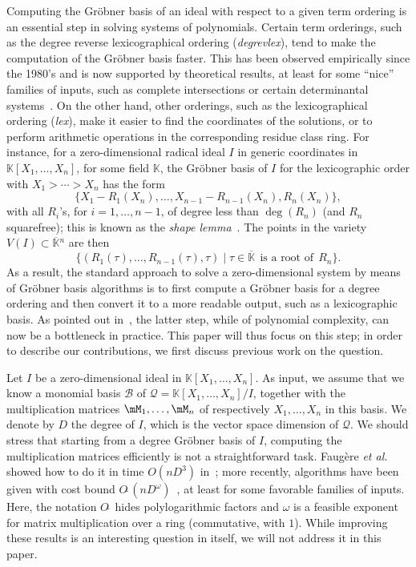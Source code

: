 \documentclass[12pt]{article}
\newcommand{\basis}{\mathscr{B}}
\newcommand{\softO}[1]{O{\tilde{~}}(#1)} %
\newcommand{\residueI}{\mathscr{Q}}
\def\K{\mathbb{K}}
\def\K {\ensuremath{\mathbb{K}}}
\def\Kbar {{\ensuremath{\overline{\mathbb{K}}}}}
\begin{document}
Computing the Gr\"obner basis of an ideal with respect to a given term
ordering is an essential step in solving systems of polynomials.
Certain term orderings, such as the degree reverse lexicographical
ordering (\textit{degrevlex}), tend to make the computation of the
Gr\"obner basis faster. This has been observed empirically since the
1980's and is now supported by theoretical results, at least for some
``nice'' families of inputs, such as complete intersections or certain
determinantal systems~\cite{Faugere02,FaSaSp13,BaFaSa15}.  On the
other hand, other orderings, such as the lexicographical ordering
(\textit{lex}), make it easier to find the coordinates of the
solutions, or to perform arithmetic operations in the corresponding
residue class ring.  For instance, for a zero-dimensional radical
ideal $I$ in generic coordinates in $\K[X_1,\dots,X_n]$, for some
field $\K$, the Gr\"obner basis of $I$ for the lexicographic order
with $X_1 > \cdots > X_n$ has the form
\begin{equation}\label{eq:shapelemma}
 \{ X_1 - R_1(X_n),\dots, X_{n-1}-R_{n-1}(X_n),R_n(X_n)\},
\end{equation}
with all $R_i$'s, for $i =1,\dots,n-1$, of degree less than
$\deg(R_n)$ (and $R_n$ squarefree); this is known as the {\em
  shape lemma}~\cite{GiMo89}. The points in the variety $V(I) \subset
\Kbar{}^n$ are then
  $$\{ ( R_1(\tau), \dots, R_{n-1}(\tau), \tau ) \mid \tau \in \Kbar
  \;\,\text{is a root of}\;\, R_n\}.$$ As a result, the standard approach to
 solve a zero-dimensional system by means of Gr\"obner basis
 algorithms is to first compute a Gr\"obner basis for a degree ordering
 and then convert it to a more readable output, such as a lexicographic
 basis. As pointed out in~\cite{FaMo17}, the latter step, while of
 polynomial complexity, can now be a bottleneck in practice. This
 paper will thus focus on this step; in order to describe our 
 contributions, we first discuss previous work on the question.

 Let $I$ be a zero-dimensional ideal in $\K[X_1,\dots,X_n]$.  As
 input, we assume that we know a monomial basis $\basis$ of
 $\residueI=\K[X_1,\dots,X_n]/I$, together with the multiplication
 matrices $\mM_1,\dots,\mM_n$ of respectively $X_1,\dots,X_n$ in this
 basis. We denote by $D$ the degree of $I$, which is the vector space
 dimension of $\residueI$. We should stress that starting from a
 degree Gr\"obner basis of $I$, computing the multiplication matrices
 efficiently is not a straightforward task. Faug\`ere {\it et al.}
 showed how to do it in time $O(nD^3)$ in~\cite{FaGiLaMo93}; more
 recently, algorithms have been given with cost bound
 $\softO{nD^\omega}$~\cite{FaGaHuRe13,FaGaHuRe14,Neiger16}, at least
 for some favorable families of inputs. Here, the notation
 $O\tilde{~}$ hides polylogarithmic factors and $\omega$ is a feasible
 exponent for matrix multiplication over a ring (commutative, with
 $1$). While improving these results is an interesting question in
 itself, we will not address it in this paper.
\end{document}

